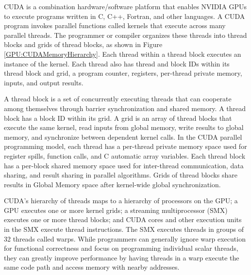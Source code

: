 CUDA is a combination hardware/software platform that enables NVIDIA GPUs to execute programs written in C, C++, Fortran, and other languages. A CUDA program invokes parallel functions called kernels that execute across many parallel threads. The programmer or compiler organizes these threads into thread blocks and grids of thread blocks, as shown in Figure \ref{GPU:CUDAMemoryHierarchy}. Each thread within a thread block executes an instance of the kernel. Each thread also has thread and block IDs within its thread block and grid, a program counter, registers, per-thread private memory, inputs, and output results.

A thread block is a set of concurrently executing threads that can cooperate among themselves through barrier synchronization and shared memory. A thread block has a block ID within its grid. A grid is an array of thread blocks that execute the same kernel, read inputs from global memory, write results to global memory, and synchronize between dependent kernel calls. In the CUDA parallel programming model, each thread has a per-thread private memory space used for register spills, function calls, and C automatic array variables. Each thread block has a per-block shared memory space used for inter-thread communication, data sharing, and result sharing in parallel algorithms. Grids of thread blocks share results in Global Memory space after kernel-wide global synchronization.

CUDA's hierarchy of threads maps to a hierarchy of processors on the GPU; a GPU executes one or more kernel grids; a streaming multiprocessor (SMX) executes one or more thread blocks; and CUDA cores and other execution units in the SMX execute thread instructions. The SMX executes threads in groups of 32 threads called warps. While programmers can generally ignore warp execution for functional correctness and focus on programming individual scalar threads, they can greatly improve performance by having threads in a warp execute the same code path and access memory with nearby addresses.

